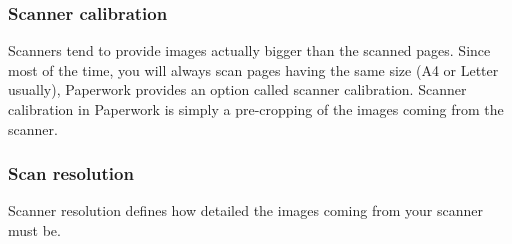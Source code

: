 \documentclass[10pt,a4paper]{article}
\begin{document}


\subsubsection{Scanner calibration}

Scanners tend to provide images actually bigger than the scanned pages.
Since most of the time, you will always scan pages having the same
size (A4 or Letter usually), Paperwork provides an option called scanner
calibration. Scanner calibration in Paperwork is simply
a pre-cropping of the images coming from the scanner.



\subsubsection{Scan resolution}

Scanner resolution defines how detailed the images coming from your
scanner must be.
\end{document}
